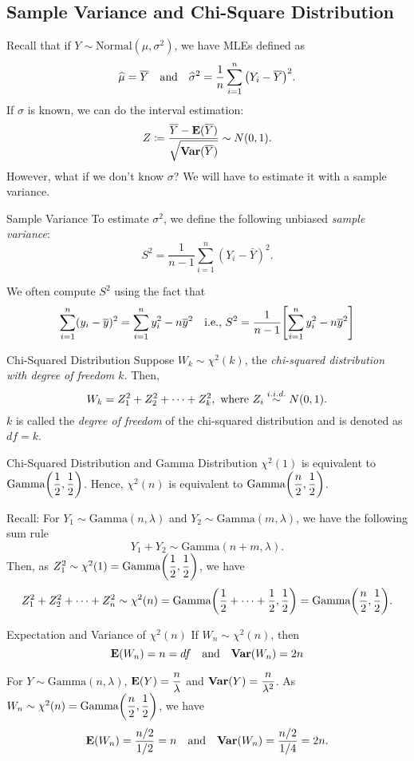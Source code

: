 \subsection{Sample Variance and Chi-Square Distribution}
Recall that if $Y\sim\text{Normal}(\mu,\sigma^2)$, we have MLEs defined as \[\widehat\mu=\overline Y\quad\text{and}\quad\widehat\sigma^2=\dfrac{1}{n}\sum_{i=1}^n\qty(Y_i-\overline Y)^2.\] If $\sigma$ is known, we can do the interval estimation: \[Z\coloneqq\dfrac{\overline Y-\vb{E}(\overline Y)}{\sqrt{\vb{Var}(\overline Y)}}\sim N(0,1).\] However, what if we don't know $\sigma$? We will have to estimate it with a sample variance. 
\begin{df}{Sample Variance}
	To estimate $\sigma^2$, we define the following unbiased \textit{sample variance}: \[S^2=\dfrac{1}{n-1}\sum_{i=1}^n(Y_i-\bar Y)^2.\]	
\end{df}
\begin{rmk}
	We often compute $S^2$ using the fact that \[\sum_{i=1}^n(y_i-\overline y)^2=\sum_{i=1}^ny_i^2-n\overline y^2\quad\text{i.e., }S^2=\dfrac{1}{n-1}\qty[\sum_{i=1}^ny_i^2-n\overline y^2]\]	
\end{rmk}
\begin{df}{Chi-Squared Distribution}
	Suppose $W_k\sim\chi^2(k)$, the \textit{chi-squared distribution with degree of freedom $k$}. Then, \[W_k=Z_1^2+Z_2^2+\cdots+Z_k^2,\text{ where }Z_i\stackrel{i.i.d.}{\sim}N(0,1).\] $k$ is called the \textit{degree of freedom} of the chi-squared distribution and is denoted as $df=k$.
\end{df}
\begin{thm}{Chi-Squared Distribution and Gamma Distribution}
	$\chi^2(1)$	 is equivalent to $\text{Gamma}\qty(\dfrac{1}{2},\dfrac{1}{2})$. Hence, $\chi^2(n)$ is equivalent to $\text{Gamma}\qty(\dfrac{n}{2},\dfrac{1}{2})$.
\end{thm}
\begin{prf}
	Recall: For $Y_1\sim\text{Gamma}(n,\lambda)$ and $Y_2\sim\text{Gamma}(m,\lambda)$, we have the following sum rule \[Y_1+Y_2\sim\text{Gamma}(n+m,\lambda).\] Then, as $Z_1^2\sim\chi^2(1)=\text{Gamma}\qty(\dfrac{1}{2},\dfrac{1}{2})$, we have \[Z_1^2+Z_2^2+\cdots+Z_n^2\sim\chi^2(n)=\text{Gamma}\qty(\dfrac{1}{2}+\cdots+\dfrac{1}{2},\dfrac{1}{2})=\text{Gamma}\qty(\dfrac{n}{2},\dfrac{1}{2}).\]
\end{prf}
\begin{thm}{Expectation and Variance of $\chi^2(n)$}
	If $W_n\sim\chi^2(n)$, then \[\vb{E}(W_n)=n=df\quad\text{and}\quad\vb{Var}(W_n)=2n\]	
\end{thm}
\begin{prf}
	For $Y\sim\text{Gamma}(n,\lambda)$, $\vb{E}(Y)=\dfrac{n}{\lambda}$ and $\vb{Var}(Y)=\dfrac{n}{\lambda^2}$. As $W_n\sim\chi^2(n)=\text{Gamma}\qty(\dfrac{n}{2},\dfrac{1}{2})$, we have \[\vb{E}(W_n)=\dfrac{n/2}{1/2}=n\quad\text{and}\quad\vb{Var}(W_n)=\dfrac{n/2}{1/4}=2n.\]
\end{prf}
